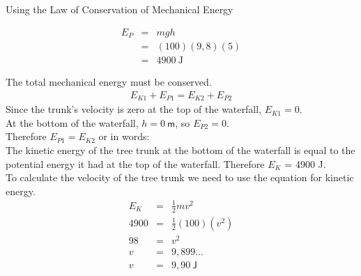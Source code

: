 \begin{wex}{Using the Law of Conservation of Mechanical Energy}
{
\begin{eqnarray*}
E_{P} &=& mgh\\
&=& (100)(9,8)(5)\\
&=& 4900~\text{J}
\end{eqnarray*}

The total mechanical energy must be conserved. 
\begin{eqnarray*}
E_{K1} + E_{P1} = E_{K2} + E_{P2}
\end{eqnarray*}
Since the trunk's velocity is zero at the top of the waterfall, $E_{K1}=0$. \\
At the bottom of the waterfall, $h = 0 \ \mathsf{m}$, so $E_{P2}=0$. \\
Therefore $E_{P1} = E_{K2}$ or in words: \\
The kinetic energy of the tree trunk at the bottom of the waterfall is equal to the potential energy it had at the top of the waterfall. Therefore $E_{K}$ = 4900 J.\\

To calculate the velocity of the tree trunk we need to use the equation for kinetic energy.
\begin{eqnarray*}
E_{K} & = & \frac{1}{2}mv^2 \\
4900 &=& \frac{1}{2} (100) (v^2) \\
98 &=& v^2\\
v &=& 9,899...\\
v &=& 9,90 \ \mathsf{J}
\end{eqnarray*}}
\end{wex}
    \noindent
\par


